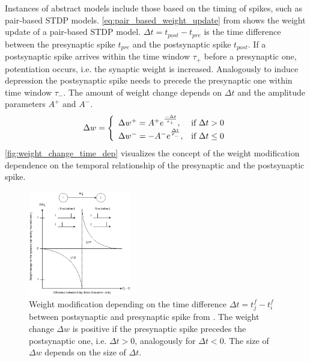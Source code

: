 Instances of abstract models include those based on the timing of spikes, such as pair-based \ac{STDP} models.
\autoref{eq:pair_based_weight_update} from \cite{Synaptic_plasticity} shows the weight update of a pair-based \ac{STDP} model.
$\Delta t = t_{post} - t_{pre}$ is the time difference between the presynaptic spike $t_{pre}$ and the postsynaptic spike $t_{post}$.
If a postsynaptic spike arrives within the time window $\tau_+$ before a presynaptic one, potentiation occurs, i.e. the synaptic weight is increased. 
Analogously to induce depression the postsynaptic spike needs to precede the presynaptic one within time window $\tau_-$.
The amount of weight change depends on $\Delta t $ and the amplitude parameters $A^+$ and $A^-$.
%
\begin{equation}
    \centering
    \label{eq:pair_based_weight_update}
    \Delta w = \left\{
        \begin{array}{ll}
        \Delta w^+ = A^+ e^{\frac{-\Delta t}{\tau_+}}, & \text{if } \Delta t > 0 \\
        \Delta w^- = -A^- e^{\frac{\Delta t}{\tau_-}}, & \text{if } \Delta t \le 0 \\
        \end{array}
        \right.
\end{equation}
%
\autoref{fig:weight_change_time_dep} visualizes the concept of 
the weight modification dependence on the temporal relationship of the presynaptic and the postsynaptic spike.
%
\begin{figure}[htbp]
    \center
    \includegraphics[width=0.4\textwidth]{pictures/weight_change_time_dep_altered.png}
    \caption{Weight modification depending on the time difference $\Delta t = t_j^f - t_i^f$ between postsynaptic and presynaptic spike from \cite{snn_weight_time}.
    The weight change $\Delta w$ is positive if the presynaptic spike precedes the postsynaptic one, i.e. $\Delta t > 0$, analogously for $\Delta t < 0$.
    The size of $\Delta w$ depends on the size of $\Delta t$.}
    \label{fig:weight_change_time_dep}
\end{figure}

